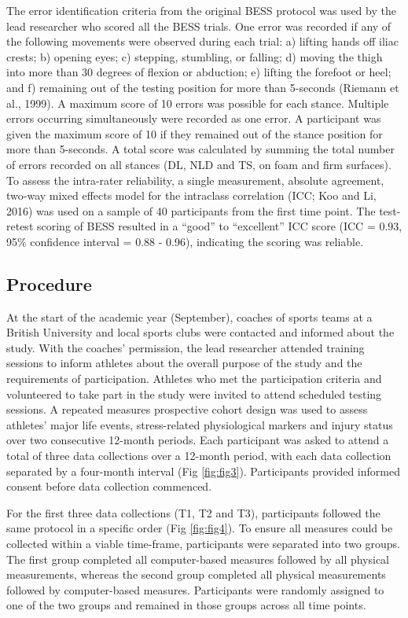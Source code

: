 \documentclass[
  english,
  man]{apa6}
\begin{document}
The error identification criteria from the original BESS protocol was used by the lead researcher who scored all the BESS trials.
One error was recorded if any of the following movements were observed during each trial: a) lifting hands off iliac crests;
b) opening eyes;
c) stepping, stumbling, or falling;
d) moving the thigh into more than 30 degrees of flexion or abduction;
e) lifting the forefoot or heel; and
f) remaining out of the testing position for more than 5-seconds (Riemann et al., 1999).
A maximum score of 10 errors was possible for each stance. Multiple errors occurring simultaneously were recorded as one error.
A participant was given the maximum score of 10 if they remained out of the stance position for more than 5-seconds.
A total score was calculated by summing the total number of errors recorded on all stances (DL, NLD and TS, on foam and firm surfaces).
To assess the intra-rater reliability, a single measurement, absolute agreement, two-way mixed effects model for the intraclass correlation (ICC; Koo and Li, 2016) was used on a sample of 40 participants from the first time point.
The test-retest scoring of BESS resulted in a ``good'' to ``excellent'' ICC score (ICC = 0.93, 95\% confidence interval = 0.88 - 0.96), indicating the scoring was reliable.

\hypertarget{procedure}{%
\subsection{Procedure}\label{procedure}}

At the start of the academic year (September), coaches of sports teams at a British University and local sports clubs were contacted and informed about the study. With the coaches' permission, the lead researcher attended training sessions to inform athletes about the overall purpose of the study and the requirements of participation. Athletes who met the participation criteria and volunteered to take part in the study were invited to attend scheduled testing sessions. A repeated measures prospective cohort design was used to assess athletes' major life events, stress-related physiological markers and injury status over two consecutive 12-month periods. Each participant was asked to attend a total of three data collections over a 12-month period, with each data collection separated by a four-month interval (Fig \ref{fig:fig3}). Participants provided informed consent before data collection commenced.

For the first three data collections (T1, T2 and T3), participants followed the same protocol in a specific order (Fig \ref{fig:fig4}).
To ensure all measures could be collected within a viable time-frame, participants were separated into two groups.
The first group completed all computer-based measures followed by all physical measurements, whereas the second group completed all physical measurements followed by computer-based measures.
Participants were randomly assigned to one of the two groups and remained in those groups across all time points.
\end{document}
